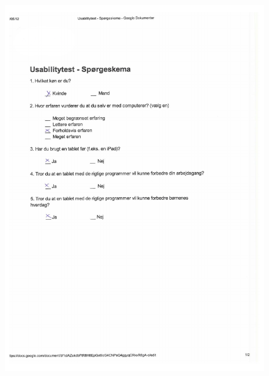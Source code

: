 \begin{figure}
	\centering
		\includegraphics{input/appendices/demo_ma1.pdf}
	\label{fig:demo_t}
\end{figure}

